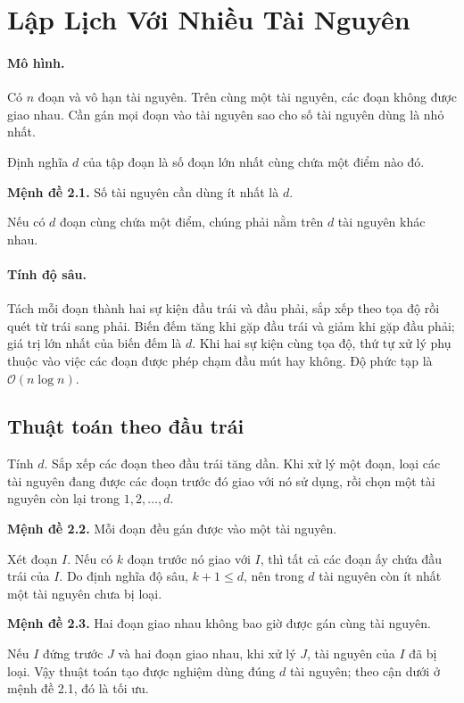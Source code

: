 \documentclass[11pt]{article}
\newcommand{\Oh}{\mathcal{O}}
\newcommand{\depth}{d}
\begin{document}
\section{Lập Lịch Với Nhiều Tài Nguyên}

\paragraph{Mô hình.}
Có \(n\) đoạn và vô hạn tài nguyên. Trên cùng một tài nguyên, các đoạn không
được giao nhau. Cần gán mọi đoạn vào tài nguyên sao cho số tài nguyên dùng là
nhỏ nhất.

Định nghĩa  \(\depth\) của tập đoạn là số đoạn lớn nhất cùng chứa
một điểm nào đó.

\textbf{Mệnh đề 2.1.} Số tài nguyên cần dùng ít nhất là \(\depth\).

Nếu có \(\depth\) đoạn cùng chứa một điểm, chúng phải nằm trên \(\depth\) tài
nguyên khác nhau.

\paragraph{Tính độ sâu.}
Tách mỗi đoạn thành hai sự kiện đầu trái và đầu phải, sắp xếp theo tọa độ rồi
quét từ trái sang phải. Biến đếm tăng khi gặp đầu trái và giảm khi gặp đầu
phải; giá trị lớn nhất của biến đếm là \(\depth\). Khi hai sự kiện cùng tọa độ,
thứ tự xử lý phụ thuộc vào việc các đoạn được phép chạm đầu mút hay không. Độ
phức tạp là \(\Oh(n\log n)\).

\subsection{Thuật toán theo đầu trái}

Tính \(\depth\). Sắp xếp các đoạn theo đầu trái tăng dần. Khi xử lý một đoạn,
loại các tài nguyên đang được các đoạn trước đó giao với nó sử dụng, rồi chọn
một tài nguyên còn lại trong \(1,2,\ldots,\depth\).

\textbf{Mệnh đề 2.2.} Mỗi đoạn đều gán được vào một tài nguyên.

Xét đoạn \(I\). Nếu có \(k\) đoạn trước nó giao với \(I\), thì tất cả các đoạn
ấy chứa đầu trái của \(I\). Do định nghĩa độ sâu, \(k+1\le\depth\), nên trong
\(\depth\) tài nguyên còn ít nhất một tài nguyên chưa bị loại.

\textbf{Mệnh đề 2.3.} Hai đoạn giao nhau không bao giờ được gán cùng tài nguyên.

Nếu \(I\) đứng trước \(J\) và hai đoạn giao nhau, khi xử lý \(J\), tài nguyên
của \(I\) đã bị loại. Vậy thuật toán tạo được nghiệm dùng đúng \(\depth\) tài
nguyên; theo cận dưới ở mệnh đề 2.1, đó là tối ưu.
\end{document}
